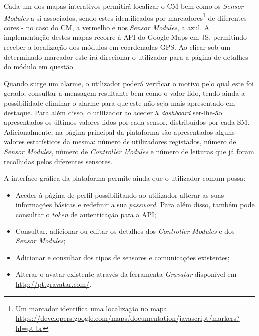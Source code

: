 Cada um dos mapas interativos permitirá localizar o \acl{CM} bem como os \textit{Sensor Modules} a si associados, sendo estes identificados por marcadores\footnote{Um marcador identifica uma localização no mapa. \\ \url{https://developers.google.com/maps/documentation/javascript/markers?hl=pt-br}} de diferentes cores - no caso do \acl{CM}, a vermelho e nos \textit{Sensor Modules}, a azul. A implementação destes mapas recorre à \ac{API} do Google Maps em \ac{JS}, permitindo receber a localização dos módulos em coordenadas \ac{GPS}. Ao clicar sob um determinado marcador este irá direcionar o utilizador para a página de detalhes do módulo em questão. 


Quando surge um  alarme, o utilizador poderá verificar o motivo pelo qual este foi gerado, consultar a mensagem resultante bem como o valor lido, tendo ainda a possibilidade eliminar o alarme para que este não seja mais apresentado em destaque. Para além disso, o utilizador ao aceder à \textit{dashboard} ser-lhe-ão apresentados os últimos valores lidos por cada sensor, distribuídos por cada \acl{SM}. Adicionalmente, na página principal da plataforma são apresentados alguns valores estatísticos da mesma: número de utilizadores registados, número de \textit{Sensor Modules}, número de \textit{Controller Modules} e número de leituras que já foram recolhidas pelos diferentes sensores. 


A interface gráfica da plataforma permite ainda que o utilizador comum possa: 

\begin{itemize}
	\item Aceder à página de perfil possibilitando ao utilizador alterar as suas informações básicas e redefinir a sua \textit{password}. Para além disso, também pode consultar o \textit{token} de autenticação para a  \ac{API}; 
	
	\item Consultar, adicionar ou editar os detalhes dos \textit{Controller Modules} e dos \textit{Sensor Modules}; 
	
	\item Adicionar e consultar dos tipos de sensores e comunicações existentes; 
	
	\item Alterar o avatar existente através da ferramenta \textit{Gravatar} disponível em \url{http://pt.gravatar.com/}. 
\end{itemize}






